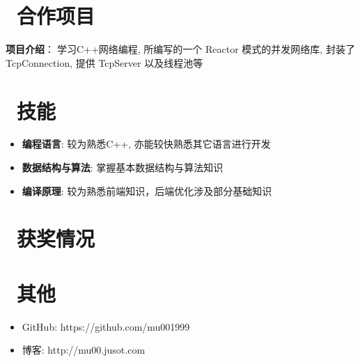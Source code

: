 \documentclass{resume}
\begin{document}
\section{\faObjectGroup\ 合作项目}
\begin{onehalfspacing}
\textbf{项目介绍}：\c 为学习C++网络编程, 所编写的一个 Reactor 模式的并发网络库, 封装了TcpConnection, 提供 TcpServer 以及线程池等
\end{onehalfspacing}


\section{\faCogs\ 技能}
\begin{itemize}[parsep=0.5ex]
  \item \textbf{编程语言}: 较为熟悉C++, 亦能较快熟悉其它语言进行开发
  \item \textbf{数据结构与算法}: 掌握基本数据结构与算法知识
  \item \textbf{编译原理}: 较为熟悉前端知识，后端优化涉及部分基础知识
\end{itemize}

\section{\faHeartO\ 获奖情况}

\section{\faInfo\ 其他}
\begin{itemize}[parsep=0.5ex]
  \item GitHub: https://github.com/mu001999
  \item 博客: http://mu00.jusot.com
\end{itemize}

%
%
\end{document}
